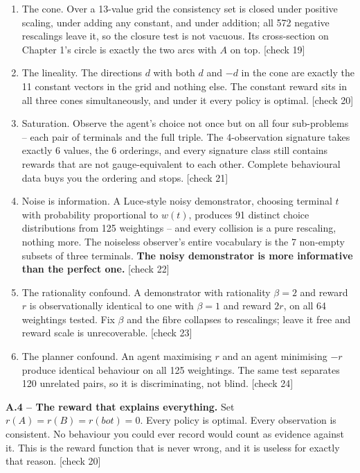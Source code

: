 \begin{enumerate}
\item The cone. Over a 13-value grid the consistency set is closed under positive scaling, under adding any constant, and under addition; all 572 negative rescalings leave it, so the closure test is not vacuous. Its cross-section on Chapter 1's circle is exactly the two arcs with $A$ on top. [check 19]
\item The lineality. The directions $d$ with both $d$ and $-d$ in the cone are exactly the 11 constant vectors in the grid and nothing else. The constant reward sits in all three cones simultaneously, and under it every policy is optimal. [check 20]
\item Saturation. Observe the agent's choice not once but on all four sub-problems -- each pair of terminals and the full triple. The 4-observation signature takes exactly 6 values, the 6 orderings, and every signature class still contains rewards that are not gauge-equivalent to each other. Complete behavioural data buys you the ordering and stops. [check 21]
\item Noise is information. A Luce-style noisy demonstrator, choosing terminal $t$ with probability proportional to $w(t)$, produces 91 distinct choice distributions from 125 weightings -- and every collision is a pure rescaling, nothing more. The noiseless observer's entire vocabulary is the 7 non-empty subsets of three terminals. \textbf{The noisy demonstrator is more informative than the perfect one.} [check 22]
\item The rationality confound. A demonstrator with rationality $\beta = 2$ and reward $r$ is observationally identical to one with $\beta = 1$ and reward $2r$, on all 64 weightings tested. Fix $\beta$ and the fibre collapses to rescalings; leave it free and reward scale is unrecoverable. [check 23]
\item The planner confound. An agent maximising $r$ and an agent minimising $-r$ produce identical behaviour on all 125 weightings. The same test separates 120 unrelated pairs, so it is discriminating, not blind. [check 24]
\end{enumerate}


\textbf{A.4 -- The reward that explains everything.} Set $r(A) = r(B) = r(bot) = 0$. Every policy is optimal. Every observation is consistent. No behaviour you could ever record would count as evidence against it. This is the reward function that is never wrong, and it is useless for exactly that reason. [check 20]

